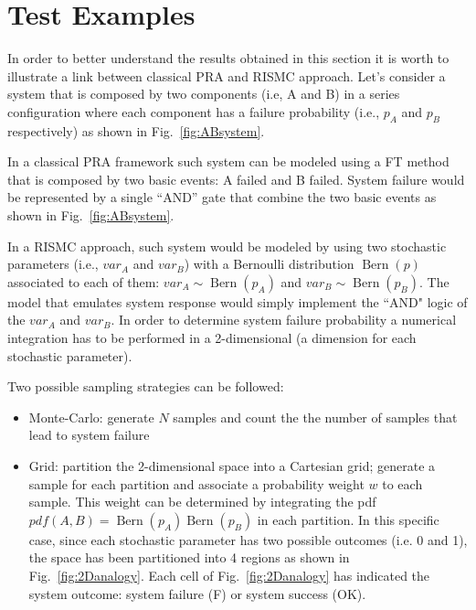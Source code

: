 \section{Test Examples}
\label{sec:test}

In order to better understand the results obtained in this section it is worth to illustrate 
a link between classical PRA and RISMC approach.
Let's consider a system that is composed by two components (i.e, A and B) in a series configuration where
each component has a failure probability (i.e., $p_A$ and $p_B$ respectively) as shown in Fig.~\ref{fig:ABsystem}.

In a classical PRA framework such system can be modeled using a FT method that is composed by two basic events:
A failed and B failed.
System failure would be represented by a single ``AND'' gate that combine the two basic events as shown in 
Fig.~\ref{fig:ABsystem}.

In a RISMC approach, such system would be modeled by using two stochastic parameters (i.e., $var_A$ and $var_B$)
with a Bernoulli distribution $\operatorname{Bern}(p)$ associated to each of them: 
$var_A \sim \operatorname{Bern}(p_A)$ and $var_B \sim \operatorname{Bern}(p_B)$. 
The model that emulates system response would simply implement the ``AND" logic of the $var_A$ and $var_B$. 
In order to determine system failure probability a numerical integration has to be performed in a 2-dimensional 
(a dimension for each stochastic parameter).

Two possible sampling strategies can be followed:
\begin{itemize}
  \item Monte-Carlo: generate $N$ samples and count the the number of samples that lead to system failure
  \item Grid: partition the 2-dimensional space into a Cartesian grid; generate a sample for each partition 
        and associate a probability weight $w$ to each sample. This weight can be determined by integrating the pdf
        $pdf(A,B) = \operatorname{Bern}(p_A) \operatorname{Bern}(p_B)$ in each partition. 
        In this specific case, since each stochastic parameter 
        has two possible outcomes (i.e. 0 and 1), the space has been partitioned into 4 regions as 
        shown in Fig.~\ref{fig:2Danalogy}. Each cell of Fig.~\ref{fig:2Danalogy} has indicated the system outcome:
        system failure (F) or system success (OK).
\end{itemize}

